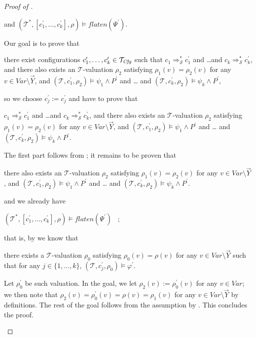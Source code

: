 \begin{proof}[Proof of ]
\begin{enumerate}
\begin{proofenv}
        and $(\mathcal{T}^*, [c^\prime_1,\ldots,c^\prime_k], \rho) \vDash \mathit{flaten}(\Psi^\prime)$.
    \end{proofenv}
    Our goal is to prove that
    \begin{proofenv}
        there exist configurations $c_1^\prime,\ldots,c_k^\prime \in \mathcal{T}_{\mathit{Cfg}}$
        such that $c_1 \Rightarrow^{*}_{\mathcal{S}} c_1^\prime$
        and \ldots and $c_k \Rightarrow^{*}_{\mathcal{S}} c_k^\prime$,
        and there also exists an $\mathcal{T}$-valuation $\rho_2$
        satisfying $\rho_1(v) = \rho_2(v)$ for any $v \in \mathit{Var} \setminus \vec{Y}$,
        and
        $(\mathcal{T}, c_1^\prime,\rho_2) \vDash \psi_1 \land P^\prime$ and \ldots
        and $(\mathcal{T}, c_k^\prime, \rho_2) \vDash \psi_k \land P^\prime$,
    \end{proofenv}
    so we choose $c^\prime_j := c^\prime_j$ and have to prove that
    \begin{proofenv}
        $c_1 \Rightarrow^{*}_{\mathcal{S}} c_1^\prime$
        and \ldots and $c_k \Rightarrow^{*}_{\mathcal{S}} c_k^\prime$,
        and there also exists an $\mathcal{T}$-valuation $\rho_2$
        satisfying $\rho_1(v) = \rho_2(v)$ for any $v \in \mathit{Var} \setminus \vec{Y}$,
        and
        $(\mathcal{T}, c_1^\prime,\rho_2) \vDash \psi_1 \land P^\prime$ and \ldots
        and $(\mathcal{T}, c_k^\prime, \rho_2) \vDash \psi_k \land P^\prime$.
    \end{proofenv}
    The first part follows from ;
    it remains to be proven that
    \begin{proofenv}
        there also exists an $\mathcal{T}$-valuation $\rho_2$
        satisfying $\rho_1(v) = \rho_2(v)$ for any $v \in \mathit{Var} \setminus \vec{Y}$,
        and
        $(\mathcal{T}, c_1^\prime,\rho_2) \vDash \psi_1 \land P^\prime$ and \ldots
        and $(\mathcal{T}, c_k^\prime, \rho_2) \vDash \psi_k \land P^\prime$.
    \end{proofenv}
    and we already have
    \begin{proofenv}
        $(\mathcal{T}^*, [c^\prime_1,\ldots,c^\prime_k], \rho) \vDash \mathit{flaten}(\Psi^\prime)$ \, ;
    \end{proofenv}
    that is, by  we know that
    \begin{proofenv}
        there exists a $\mathcal{T}$-valuation $\rho_0$ satisfying $\rho_0(v) = \rho(v)$
        for any $v \in \mathit{Var} \setminus \vec{Y}$ such that for any $j \in \{ 1, \ldots, k \}$,
        $(\mathcal{T}, c^\prime_j, \rho_0) \vDash \varphi^\prime$.
    \end{proofenv}
    Let $\rho_0^\prime$ be such valuation.
    In the goal, we let $\rho_2(v) := \rho_0^\prime(v)$ for any $v \in \mathit{Var}$;
    we then note that $\rho_2(v) = \rho_0^\prime(v) =  \rho(v) =  \rho_1(v)$ for any $v \in \mathit{Var} \setminus \vec{Y}$ by definitions.
    The rest of the goal follows from the assumption by .
    This concludes the proof.
\end{enumerate}
\end{proof}


